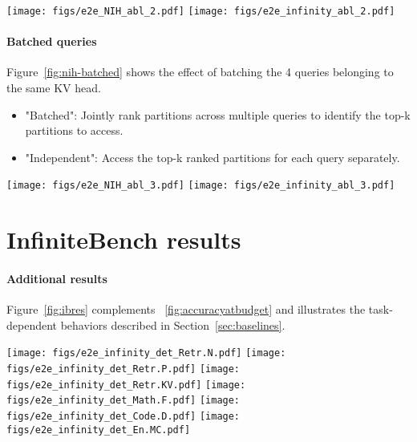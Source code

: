 \begin{figure*}
    \centering
    \texttt{[image: figs/e2e\_NIH\_abl\_2.pdf]}%
    \texttt{[image: figs/e2e\_infinity\_abl\_2.pdf]}  
    \caption{
        Comparison of dense context sizes on the needle-in-haystack (left) and InfiniteBench En.QA (right) tasks. 
    }
    \label{fig:nih-dense}
\end{figure*}

\paragraph{Batched queries}
\label{app:batchedqueries}

Figure~\ref{fig:nih-batched} shows the effect of batching the 4 queries belonging to the same KV head.

\begin{itemize}
    \item 
    "Batched": Jointly rank partitions across multiple queries to identify the top-k partitions to access.
    \item 
    "Independent": Access the top-k ranked partitions for each query separately.
\end{itemize}

\begin{figure*}
    \centering
    \texttt{[image: figs/e2e\_NIH\_abl\_3.pdf]}%
    \texttt{[image: figs/e2e\_infinity\_abl\_3.pdf]}  
    \caption{
        Comparison of batched and independent queries on the needle-in-haystack (left) and InfiniteBench En.QA (right) tasks. 
    }
    \label{fig:nih-batched}
\end{figure*}

\section{InfiniteBench results}

\paragraph{Additional results} Figure~\ref{fig:ibres} complements ~\autoref{fig:accuracyatbudget} and illustrates the task-dependent behaviors described in Section~\ref{sec:baselines}.
\label{app:infinitebenchres} 

\begin{figure*}
    \centering
    \texttt{[image: figs/e2e\_infinity\_det\_Retr.N.pdf]}%
    \texttt{[image: figs/e2e\_infinity\_det\_Retr.P.pdf]}
    \vspace{10pt}
    \texttt{[image: figs/e2e\_infinity\_det\_Retr.KV.pdf]}%
    \texttt{[image: figs/e2e\_infinity\_det\_Math.F.pdf]}
    \vspace{10pt}
    \texttt{[image: figs/e2e\_infinity\_det\_Code.D.pdf]}%
    \texttt{[image: figs/e2e\_infinity\_det\_En.MC.pdf]}    
    \caption{
        Performance on selected InfiniteBench tasks 
    }
    \label{fig:ibres}
\end{figure*}

